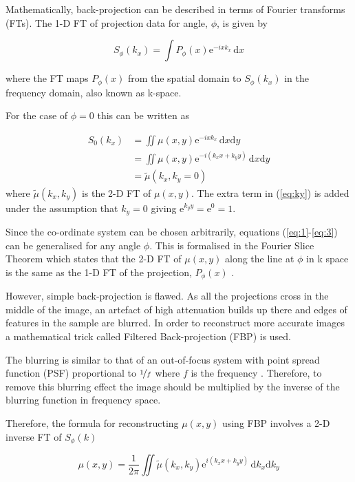 \documentclass[12pt]{article}
\begin{document}
Mathematically, back-projection can be described in terms of Fourier transforms (FTs). The 1-D FT of projection data for  angle, $\phi$, is given by

\begin{equation}
S_{\phi}(k_x) = \int P_{\phi}(x)\mathrm{e}^{-i x k_x}\, \mathrm{d}x
\end{equation}

where the FT maps $P_{\phi}(x)$ from the spatial domain to $S_{\phi}(k_x)$ in the frequency domain, also known as k-space.

For the case of $\phi = 0$ this can  be written as

\begin{align}
S_{0}(k_x) &= \iint \mu(x,y) \mathrm{e}^{-i x k_x }\, \mathrm{d}x\mathrm{d}y \label{eq:1}\\
  &= \iint \mu(x,y) \mathrm{e}^{-i(k_xx +k_yy)}\, \mathrm{d}x\mathrm{d}y \label{eq:ky} \\ 
  &= \tilde{\mu}(k_x,k_y=0) \label{eq:3}
\end{align}
where $\tilde{\mu}(k_x,k_y)$ is the 2-D FT of $\mu(x,y)$.
The extra term in (\ref{eq:ky}) is added  under the assumption that $k_y = 0$ giving $\mathrm{e}^{k_yy}=\mathrm{e}^{0}=1$. 

Since the co-ordinate system can be chosen arbitrarily, equations (\ref{eq:1}-\ref{eq:3}) can be generalised for any angle $\phi$.
This  is formalised in the Fourier Slice Theorem which states that the 2-D FT of $\mu(x,y)$ along the line at $\phi$ in k space is the same as the 1-D FT of the projection, $P_{\phi}(x)$ \cite{Doran:2008kh}.

However, simple back-projection is flawed. As all the projections cross in the middle of the image, an artefact of high attenuation builds up there and edges of features in the sample are blurred.  In order to reconstruct more accurate images a mathematical trick called Filtered Back-projection (FBP) is used. 

The blurring is similar to that of an out-of-focus system with point spread function (PSF) proportional to $\nicefrac{1}{f}$ where $f$ is the frequency \cite{russ2002image}. Therefore, to remove this blurring effect the image should be multiplied by the inverse of the blurring function in frequency space.

Therefore, the formula for reconstructing $\mu(x,y)$ using FBP involves a 2-D inverse FT of $S_{\phi}(k)$

\begin{equation}
\mu(x,y) = \frac{1}{2\pi} \iint \tilde{\mu}(k_x,k_y) \mathrm{e}^{i\left(k_xx+k_yy\right)}\, \mathrm{d}k_x\mathrm{d}k_y
\end{equation}
\end{document}

